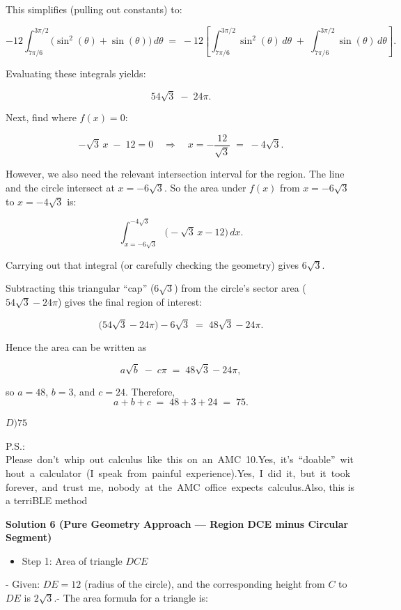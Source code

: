 \begin{enumerate}
 This simplifies (pulling out constants) to:

 
 \[-12 \int_{7\pi/6}^{3\pi/2}\bigl(\sin^2(\theta) + \sin(\theta)\bigr)\, d\theta\;=\;-12 \left[\int_{7\pi/6}^{3\pi/2} \sin^2(\theta)\,d\theta\;+\;\int_{7\pi/6}^{3\pi/2} \sin(\theta)\,d\theta\right].\]

 Evaluating these integrals yields:

 
 \[54\sqrt{3} \;-\; 24\pi.\]

 Next, find where \(f(x)=0\):

 
 \[-\sqrt{3}\,x \;-\; 12 = 0\quad\Longrightarrow\quad x = -\frac{12}{\sqrt{3}} \;=\; -4\sqrt{3}.\]

 However, we also need the relevant intersection interval for the region.  The line and the circle intersect at \(x=-6\sqrt{3}\).  So the area under \(f(x)\) from \(x=-6\sqrt{3}\) to \(x=-4\sqrt{3}\) is:

 
 \[\int_{x=-6\sqrt{3}}^{-4\sqrt{3}} \bigl(-\sqrt{3}\,x - 12\bigr)\,dx.\]

 Carrying out that integral (or carefully checking the geometry) gives \(6\sqrt{3}.\)

 Subtracting this triangular “cap” (\(6\sqrt{3}\)) from the circle’s sector area (\(54\sqrt{3}-24\pi\)) gives the final region of interest:

 
 \[\bigl(54\sqrt{3} - 24\pi\bigr) - 6\sqrt{3}\;=\;48\sqrt{3} - 24\pi.\]

 Hence the area can be written as

 
 \[a\sqrt{b} \;-\; c\pi\;=\;48\sqrt{3} - 24\pi,\]

 so \(a=48\), \(b=3\), and \(c=24.\)  Therefore,
 \[a + b + c \;=\; 48 + 3 + 24 \;=\; 75.\]

 \(\boxed{D)75}\)

 P.S.: Please don’t whip out calculus like this on an AMC 10.Yes, it’s “doable” without a calculator (I speak from painful experience).Yes, I did it, but it took forever, and trust me, nobody at the AMC office expects calculus.Also, this is a terriBLE method

 



\textbf{Solution 6 (Pure Geometry Approach — Region DCE minus Circular Segment)}


            \begin{itemize}
        \item Step 1: Area of triangle $DCE$
            \end{itemize}
            - Given: $DE = 12$ (radius of the circle), and the corresponding height from $C$ to $DE$ is $2\sqrt{3}$.- The area formula for a triangle is:


\end{enumerate}
